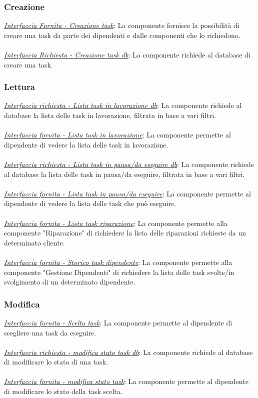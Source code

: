 \documentclass{report}
\begin{document}
\subsubsection*{\indent \indent Creazione}
\uline{\textit{Interfaccia Fornita - Creazione task}}: 
La componente fornisce la possibilità di creare una task da parte dei dipendenti e dalle componenti che lo richiedono. \\\\
\textcolor{Database}{\uline{\textit{Interfaccia Richiesta - Creazione task db}}}:
La componente richiede al database di creare una task. 
\subsubsection*{\indent \indent Lettura}
\textcolor{Database}{\uline{\textit{Interfaccia richiesta - Lista task in lavorazione db}}}: 
La componente richiede al database la lista delle task in lavorazione, filtrata in base a vari filtri.\\\\
\uline{\textit{Interfaccia fornita - Lista task in lavorazione}}: 
La componente permette al dipendente di vedere  la lista delle task in lavorazione.\\\\
\textcolor{Database}{\uline{\textit{Interfaccia richiesta - Lista task in pausa/da eseguire db}}}: 
La componente richiede al database la lista delle task in pausa/da eseguire, filtrata in base a vari filtri.\\\\
\uline{\textit{Interfaccia fornita - Lista task in pausa/da eseguire}}: 
La componente permette al dipendente di vedere la lista delle task che può eseguire.\\\\
\uline{\textit{Interfaccia fornita - Lista task riparazione}}:
La componente permette alla componente "Riparazione" di richiedere la lista delle riparazioni richieste da un determinato cliente.\\\\
\uline{\textit{Interfaccia fornita - Storico task dipendente}}:
La componente permette alla componente "Gestione Dipendenti" di richiedere la lista delle task svolte/in svolgimento di un determinato dipendente.
\subsubsection*{\indent \indent Modifica}
\uline{\textit{Interfaccia fornita - Scelta task}}: 
La componente permette al dipendente di scegliere una task da eseguire.\\\\
\textcolor{Database}{\uline{\textit{Interfaccia richiesta - modifica stato task db}}}:
 La componente richiede al database di modificare lo stato di una task.\\\\
\uline{\textit{Interfaccia fornita - modifica stato task}}: 
La componente permette al dipendente di modificare lo stato della task scelta.
\end{document}
